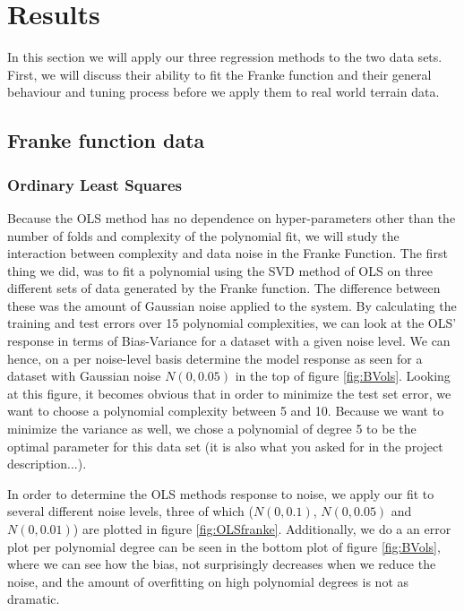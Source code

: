 \documentclass[a4paper, twocolumn]{article}
\begin{document}

\section{Results}
In this section we will apply our three regression methods to the two data sets. First, we will discuss their ability to fit the Franke function and their general behaviour and tuning process before we apply them to real world terrain data.

\subsection{Franke function data}
\subsubsection{Ordinary Least Squares}
Because the OLS method has no dependence on hyper-parameters other than the number of folds and complexity of the polynomial fit, we will study the interaction between complexity and data noise in the Franke Function. The first thing we did, was to fit a polynomial using the SVD method of OLS on three different sets of data generated by the Franke function. The difference between these was the amount of Gaussian noise applied to the system. By calculating the training and test errors over 15 polynomial complexities, we can look at the OLS' response in terms of Bias-Variance for a dataset with a given noise level. We can hence, on a per noise-level basis determine the model response as seen for a dataset with Gaussian noise $N(0,0.05)$ in the top of figure \ref{fig:BVols}. Looking at this figure, it becomes obvious that in order to minimize the test set error, we want to choose a polynomial complexity between 5 and 10. Because we want to minimize the variance as well, we chose a polynomial of degree 5 to be the optimal parameter for this data set (it is also what you asked for in the project description...).

In order to determine the OLS methods response to noise, we apply our fit to several different noise levels, three of which ($N(0,0.1)$, $N(0,0.05)$ and $N(0,0.01)$) are plotted in figure \ref{fig:OLSfranke}. Additionally, we do a an error plot per polynomial degree can be seen in the bottom plot of figure \ref{fig:BVols}, where we can see how the bias, not surprisingly decreases when we reduce the noise, and the amount of overfitting on high polynomial degrees is not as dramatic.
\end{document}
